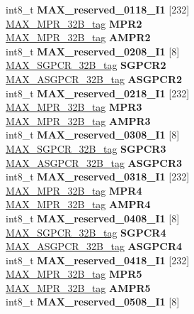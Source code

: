 \begin{DoxyCompactItemize}
\begin{tabbing}
\>\>int8\_t {\bfseries MAX\_reserved\_0118\_I1} \mbox{[}232\mbox{]}\\
\>\>\mbox{\hyperlink{unionMAX__MPR__32B__tag}{MAX\_MPR\_32B\_tag}} {\bfseries MPR2}\\
\>\>\mbox{\hyperlink{unionMAX__MPR__32B__tag}{MAX\_MPR\_32B\_tag}} {\bfseries AMPR2}\\
\>\>int8\_t {\bfseries MAX\_reserved\_0208\_I1} \mbox{[}8\mbox{]}\\
\>\>\mbox{\hyperlink{unionMAX__SGPCR__32B__tag}{MAX\_SGPCR\_32B\_tag}} {\bfseries SGPCR2}\\
\>\>\mbox{\hyperlink{unionMAX__ASGPCR__32B__tag}{MAX\_ASGPCR\_32B\_tag}} {\bfseries ASGPCR2}\\
\>\>int8\_t {\bfseries MAX\_reserved\_0218\_I1} \mbox{[}232\mbox{]}\\
\>\>\mbox{\hyperlink{unionMAX__MPR__32B__tag}{MAX\_MPR\_32B\_tag}} {\bfseries MPR3}\\
\>\>\mbox{\hyperlink{unionMAX__MPR__32B__tag}{MAX\_MPR\_32B\_tag}} {\bfseries AMPR3}\\
\>\>int8\_t {\bfseries MAX\_reserved\_0308\_I1} \mbox{[}8\mbox{]}\\
\>\>\mbox{\hyperlink{unionMAX__SGPCR__32B__tag}{MAX\_SGPCR\_32B\_tag}} {\bfseries SGPCR3}\\
\>\>\mbox{\hyperlink{unionMAX__ASGPCR__32B__tag}{MAX\_ASGPCR\_32B\_tag}} {\bfseries ASGPCR3}\\
\>\>int8\_t {\bfseries MAX\_reserved\_0318\_I1} \mbox{[}232\mbox{]}\\
\>\>\mbox{\hyperlink{unionMAX__MPR__32B__tag}{MAX\_MPR\_32B\_tag}} {\bfseries MPR4}\\
\>\>\mbox{\hyperlink{unionMAX__MPR__32B__tag}{MAX\_MPR\_32B\_tag}} {\bfseries AMPR4}\\
\>\>int8\_t {\bfseries MAX\_reserved\_0408\_I1} \mbox{[}8\mbox{]}\\
\>\>\mbox{\hyperlink{unionMAX__SGPCR__32B__tag}{MAX\_SGPCR\_32B\_tag}} {\bfseries SGPCR4}\\
\>\>\mbox{\hyperlink{unionMAX__ASGPCR__32B__tag}{MAX\_ASGPCR\_32B\_tag}} {\bfseries ASGPCR4}\\
\>\>int8\_t {\bfseries MAX\_reserved\_0418\_I1} \mbox{[}232\mbox{]}\\
\>\>\mbox{\hyperlink{unionMAX__MPR__32B__tag}{MAX\_MPR\_32B\_tag}} {\bfseries MPR5}\\
\>\>\mbox{\hyperlink{unionMAX__MPR__32B__tag}{MAX\_MPR\_32B\_tag}} {\bfseries AMPR5}\\
\>\>int8\_t {\bfseries MAX\_reserved\_0508\_I1} \mbox{[}8\mbox{]}\\

\end{tabbing}
\end{DoxyCompactItemize}
